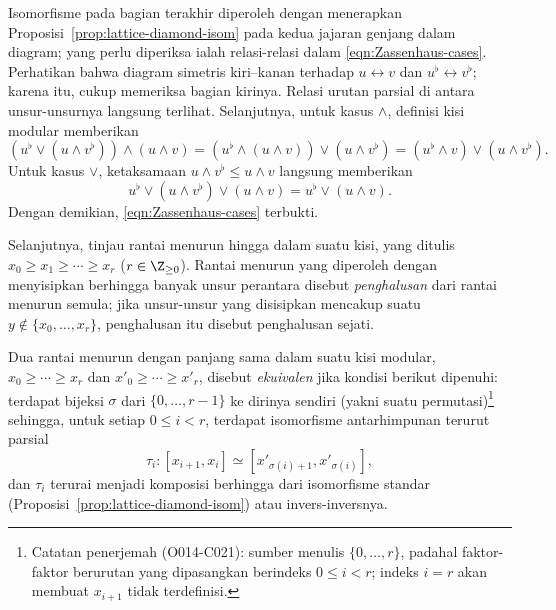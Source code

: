 \begin{bukti}
	Isomorfisme pada bagian terakhir diperoleh dengan menerapkan
	Proposisi~\ref{prop:lattice-diamond-isom} pada kedua jajaran genjang dalam
	diagram; yang perlu diperiksa ialah relasi-relasi dalam
	\eqref{eqn:Zassenhaus-cases}. Perhatikan bahwa diagram simetris kiri--kanan
	terhadap $u \leftrightarrow v$ dan $u^\flat \leftrightarrow v^\flat$;
	karena itu, cukup memeriksa bagian kirinya. Relasi urutan parsial di antara
	unsur-unsurnya langsung terlihat. Selanjutnya, untuk kasus $\wedge$,
	definisi kisi modular memberikan
	\begin{equation*}
		\left( u^\flat \vee (u \wedge v^\flat)\right) \wedge (u \wedge v) = \left( u^\flat \wedge (u \wedge v) \right) \vee (u \wedge v^\flat) = (u^\flat \wedge v) \vee (u \wedge v^\flat).
	\end{equation*}
	Untuk kasus $\vee$, ketaksamaan $u \wedge v^\flat \leq u \wedge v$ langsung
	memberikan
	\begin{equation*}
		u^\flat \vee (u \wedge v^\flat) \vee (u \wedge v) = u^\flat \vee (u \wedge v).
	\end{equation*}
	Dengan demikian, \eqref{eqn:Zassenhaus-cases} terbukti.
\end{bukti}

Selanjutnya, tinjau rantai menurun hingga dalam suatu kisi, yang ditulis
$x_0 \geq x_1 \geq \cdots \geq x_r$ ($r \in \Z_{\geq 0}$). Rantai menurun
yang diperoleh dengan menyisipkan berhingga banyak unsur perantara disebut
\emph{penghalusan} dari rantai menurun semula; jika unsur-unsur yang disisipkan
mencakup suatu $y \notin \{x_0,\ldots,x_r\}$, penghalusan itu disebut
penghalusan sejati.

\begin{definisi}\label{def:Schreier-equiv}
	Dua rantai menurun dengan panjang sama dalam suatu kisi modular,
	$x_0 \geq \cdots \geq x_r$ dan $x'_0 \geq \cdots \geq x'_r$, disebut
	\emph{ekuivalen} jika kondisi berikut dipenuhi: terdapat bijeksi
	$\sigma$ dari $\{0,\ldots,r-1\}$ ke dirinya sendiri (yakni suatu
	permutasi)\footnote{Catatan penerjemah (O014-C021): sumber menulis
	$\{0,\ldots,r\}$, padahal faktor-faktor berurutan yang dipasangkan berindeks
	$0\leq i<r$; indeks $i=r$ akan membuat $x_{i+1}$ tidak terdefinisi.}
	sehingga, untuk setiap $0\leq i<r$, terdapat isomorfisme antarhimpunan
	terurut parsial
	\[ \tau_i: \left[ x_{i+1}, x_i \right] \simeq \left[ x'_{\sigma(i) + 1}, x'_{\sigma(i)} \right], \]
	dan $\tau_i$ terurai menjadi komposisi berhingga dari isomorfisme standar
	(Proposisi~\ref{prop:lattice-diamond-isom}) atau invers-inversnya.
\end{definisi}

